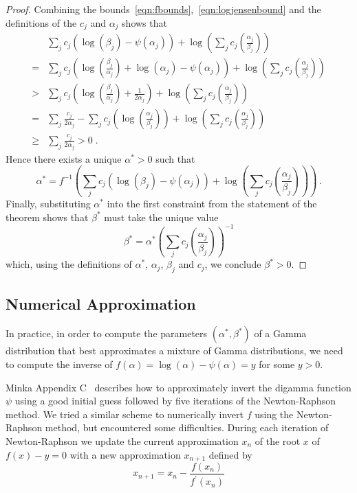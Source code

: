 \documentclass[twoside, 11pt]{article}
\begin{document}
\begin{proof}
Combining the bounds~\ref{eqn:fbounds},~\ref{eqn:logjensenbound} and the definitions of the $c_j$ and $\alpha_j$ shows that
\begin{align}
& \sum_j c_j \left( \log(\beta_j) - \psi(\alpha_j) \right)
+ \log\left( \sum_j c_j \left(\frac{\alpha_j}{\beta_j}\right) \right) \nonumber \\
= &
\sum_j c_j \left( \log\left(\frac{\beta_j}{\alpha_j}\right) + \log(\alpha_j) - \psi(\alpha_j) \right)
+ \log\left( \sum_j c_j \left(\frac{\alpha_j}{\beta_j}\right) \right) \nonumber \\
> & 
\sum_j c_j \left( \log\left(\frac{\beta_j}{\alpha_j}\right) + \frac{1}{2\alpha_j} \right)
+ \log\left( \sum_j c_j \left(\frac{\alpha_j}{\beta_j}\right) \right) \nonumber \\
= &
\sum_j \frac{c_j}{2 \alpha_j} - \sum_j c_j \left( \log\left(\frac{\alpha_j}{\beta_j}\right) \right)
+ \log\left( \sum_j c_j \left(\frac{\alpha_j}{\beta_j}\right) \right) \nonumber \\
\geq &
\sum_j \frac{c_j}{2 \alpha_j}
> 0 \; . \nonumber
\end{align}
Hence there exists a unique $\alpha^* > 0$ such that
\begin{equation}
\alpha^* = f^{-1} \left(
\sum_j c_j \left( \log(\beta_j) - \psi(\alpha_j) \right)
+ \log\left( \sum_j c_j \left(\frac{\alpha_j}{\beta_j}\right) \right)
\right) \, . \nonumber
\end{equation}
Finally, substituting $\alpha^*$ into the first constraint from the statement of the theorem shows that $\beta^*$ must take the unique value
\begin{equation}
\beta^{*} = \alpha^{*} \left( \sum_j c_j \left(\frac{\alpha_j}{\beta_j}\right) \right)^{-1}
\end{equation}
which, using the definitions of $\alpha^*$, $\alpha_j$, $\beta_j$ and $c_j$, we conclude $\beta^* > 0$.
\end{proof}

\subsection{Numerical Approximation}

In practice, in order to compute the parameters $(\alpha^*, \beta^*)$ of a Gamma distribution that best approximates a mixture of Gamma distributions, we need to compute the inverse of $f(\alpha) = \log(\alpha) - \psi(\alpha) = y$ for some $y > 0$.

Minka Appendix C~\citep{minka2000estimating} describes how to approximately invert the digamma function $\psi$ using a good initial guess followed by five iterations of the Newton-Raphson method. We tried a similar scheme to numerically invert $f$ using the Newton-Raphson method, but encountered some difficulties. During each iteration of Newton-Raphson we update the current approximation $x_n$ of the root $x$ of $f(x) - y = 0$ with a new approximation $x_{n+1}$ defined by
\begin{equation}
x_{n+1} = x_n - \frac{f(x_n)}{f^{\prime}(x_n)}
\end{equation}
\end{document}
